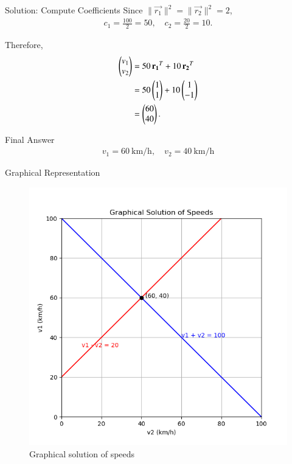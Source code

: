 \documentclass{beamer}
\begin{document}
\begin{frame}{Solution: Compute Coefficients}
Since $\|\vec{r_1}\|^2 = \|\vec{r_2}\|^2 = 2$,
\begin{align}
c_1 = \frac{100}{2} = 50, \quad c_2 = \frac{20}{2} = 10.
\end{align}

Therefore,
\begin{align}
\begin{pmatrix}v_1 \\ v_2\end{pmatrix} &= 50\,\mathbf{r_1}^{T} + 10\,\mathbf{r_2}^{T} \\
&= 50\begin{pmatrix}1 \\ 1\end{pmatrix} + 10\begin{pmatrix}1 \\ -1\end{pmatrix} \\
&= \begin{pmatrix}60 \\ 40\end{pmatrix}.
\end{align}
\end{frame}

\begin{frame}{Final Answer}
\begin{align}
\boxed{v_1 = 60~\text{km/h}}, \quad \boxed{v_2 = 40~\text{km/h}}
\end{align}
\end{frame}

\begin{frame}{Graphical Representation}
\begin{figure}[ht!]
\centering
\includegraphics[height=0.6\textheight, keepaspectratio]{figs/speed.png}
\caption{Graphical solution of speeds}
\end{figure}
\end{frame}
\end{document}
